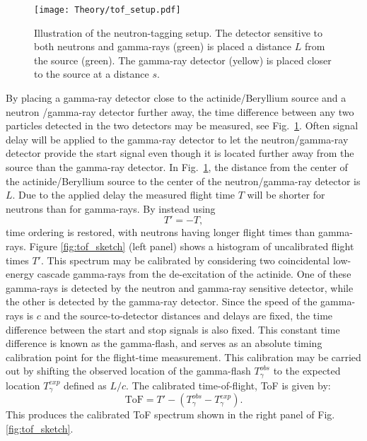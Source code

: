 \documentclass[main.tex]{subfiles}
\begin{document}
\begin{figure}[t]
    \centering
        \texttt{[image: Theory/tof\_setup.pdf]}
        \caption[Illustration of the neutron-tagging setup.]{Illustration of the neutron-tagging setup. The detector sensitive to both neutrons and gamma-rays (green) is placed a distance $L$ from the source (green). The gamma-ray detector (yellow) is placed closer to the source at a distance $s$. }
    \label{fig:tof_setup} 
\end{figure}

By placing a gamma-ray detector close to the actinide/Beryllium source and a neutron /gamma-ray detector further away, the time difference between any two particles detected in the two detectors may be measured, see Fig.~\ref{fig:tof_setup}. Often signal delay will be applied to the gamma-ray detector to let the neutron/gamma-ray detector provide the start signal even though it is located further away from the source than the gamma-ray detector.
In Fig.~\ref{fig:tof_setup}, the distance from the center of the actinide/Beryllium source to the center of the neutron/gamma-ray detector is $L$.  Due to the applied delay the measured flight time $T$ will be shorter for neutrons than for gamma-rays. By instead using
\begin{equation}
T'=-T,
\end{equation}
time ordering is restored, with neutrons having longer flight times than gamma-rays. Figure \ref{fig:tof_sketch} (left panel) shows a histogram of uncalibrated flight times $T'$. This spectrum may be calibrated by considering two coincidental low-energy cascade gamma-rays from the de-excitation of the actinide. One of these gamma-rays is detected by the neutron and gamma-ray sensitive detector, while the other is detected by the gamma-ray detector. 
Since the speed of the gamma-rays is $c$ and the source-to-detector distances and delays are fixed, the time difference between the start and stop signals is also fixed. This constant time difference is known as the gamma-flash, and serves as an absolute timing calibration point for the flight-time measurement.
This calibration may be carried out by shifting the observed location of the gamma-flash $T_\gamma^{obs}$ to the expected location $T_\gamma^{exp}$ defined as $L/c$. The calibrated time-of-flight, ToF is given by:
\begin{equation}
	\textrm{ToF} = T' -(T_\gamma^{obs} - T_\gamma^{exp}).
	\label{eq:tof_cal}
\end{equation}
This produces the calibrated ToF spectrum shown in the right panel of Fig. \ref{fig:tof_sketch}.
\end{document}
